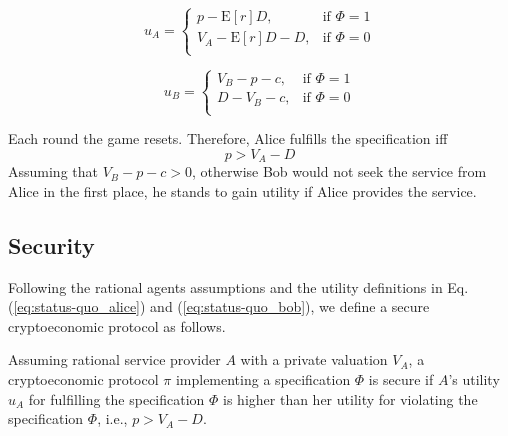 \documentclass[runningheads]{llncs}
\begin{document}

\begin{equation}
\label{eq:status-quo_alice}
u_A = 
\begin{cases}
    p - \mathrm{E}[r]D, & \text{if $\Phi=1$} \\
    V_A - \mathrm{E}[r]D-D, & \text{if $\Phi=0$} \\
\end{cases}
\end{equation}





\begin{equation}
\label{eq:status-quo_bob}
u_B= 
\begin{cases}
V_B - p-c, & \text{if $\Phi=1$} \\
D -V_B -c , & \text{if $\Phi=0$} \\
\end{cases}
\end{equation}


\noindent Each round the game resets. 
Therefore, Alice fulfills the specification iff 
\begin{equation}
    \label{eq:decision_model_alice}
    p > V_A - D
\end{equation}
Assuming that $V_B-p-c>0$, otherwise Bob would not seek the service from Alice in the first place, he stands to gain utility if Alice provides the service. %

\subsection{Security}
Following the rational agents assumptions and the utility definitions in Eq. (\ref{eq:status-quo_alice}) and (\ref{eq:status-quo_bob}), we define a secure cryptoeconomic protocol as follows.

\begin{definition}[Security]
    Assuming rational service provider $A$ with a private valuation $V_A$, a cryptoeconomic protocol $\pi$ implementing a specification $\Phi$ is secure if $A$'s utility $u_A$ for fulfilling the specification $\Phi$ is higher than her utility for violating the specification $\Phi$, i.e., $p>V_A-D$.  
    \label{def:security}
\end{definition}
\end{document}
